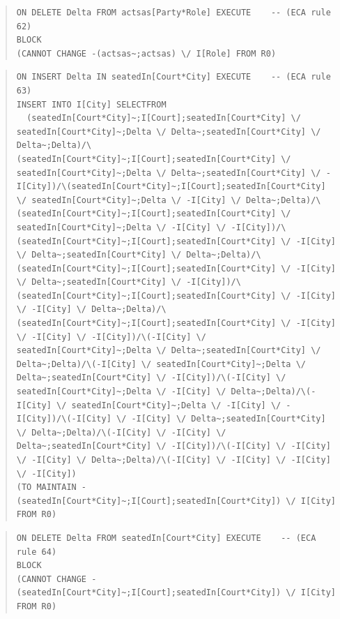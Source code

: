 \documentclass[10pt,a4paper]{report}              %
\theoremstyle{plain}\theorembodyfont{\rmfamily}\newtheorem{definition}{Definition}[section]
\theoremstyle{plain}\theorembodyfont{\rmfamily}\newtheorem{designrule}[definition]{Requirement}
\begin{document}
\begin{quote}
\begin{verbatim}
ON DELETE Delta FROM actsas[Party*Role] EXECUTE    -- (ECA rule 62)
BLOCK
(CANNOT CHANGE -(actsas~;actsas) \/ I[Role] FROM R0)
\end{verbatim}
\end{quote}
\begin{quote}
\begin{verbatim}
ON INSERT Delta IN seatedIn[Court*City] EXECUTE    -- (ECA rule 63)
INSERT INTO I[City] SELECTFROM
  (seatedIn[Court*City]~;I[Court];seatedIn[Court*City] \/ seatedIn[Court*City]~;Delta \/ Delta~;seatedIn[Court*City] \/ Delta~;Delta)/\(seatedIn[Court*City]~;I[Court];seatedIn[Court*City] \/ seatedIn[Court*City]~;Delta \/ Delta~;seatedIn[Court*City] \/ -I[City])/\(seatedIn[Court*City]~;I[Court];seatedIn[Court*City] \/ seatedIn[Court*City]~;Delta \/ -I[City] \/ Delta~;Delta)/\(seatedIn[Court*City]~;I[Court];seatedIn[Court*City] \/ seatedIn[Court*City]~;Delta \/ -I[City] \/ -I[City])/\(seatedIn[Court*City]~;I[Court];seatedIn[Court*City] \/ -I[City] \/ Delta~;seatedIn[Court*City] \/ Delta~;Delta)/\(seatedIn[Court*City]~;I[Court];seatedIn[Court*City] \/ -I[City] \/ Delta~;seatedIn[Court*City] \/ -I[City])/\(seatedIn[Court*City]~;I[Court];seatedIn[Court*City] \/ -I[City] \/ -I[City] \/ Delta~;Delta)/\(seatedIn[Court*City]~;I[Court];seatedIn[Court*City] \/ -I[City] \/ -I[City] \/ -I[City])/\(-I[City] \/ seatedIn[Court*City]~;Delta \/ Delta~;seatedIn[Court*City] \/ Delta~;Delta)/\(-I[City] \/ seatedIn[Court*City]~;Delta \/ Delta~;seatedIn[Court*City] \/ -I[City])/\(-I[City] \/ seatedIn[Court*City]~;Delta \/ -I[City] \/ Delta~;Delta)/\(-I[City] \/ seatedIn[Court*City]~;Delta \/ -I[City] \/ -I[City])/\(-I[City] \/ -I[City] \/ Delta~;seatedIn[Court*City] \/ Delta~;Delta)/\(-I[City] \/ -I[City] \/ Delta~;seatedIn[Court*City] \/ -I[City])/\(-I[City] \/ -I[City] \/ -I[City] \/ Delta~;Delta)/\(-I[City] \/ -I[City] \/ -I[City] \/ -I[City])
(TO MAINTAIN -(seatedIn[Court*City]~;I[Court];seatedIn[Court*City]) \/ I[City] FROM R0)
\end{verbatim}
\end{quote}
\begin{quote}
\begin{verbatim}
ON DELETE Delta FROM seatedIn[Court*City] EXECUTE    -- (ECA rule 64)
BLOCK
(CANNOT CHANGE -(seatedIn[Court*City]~;I[Court];seatedIn[Court*City]) \/ I[City] FROM R0)
\end{verbatim}
\end{quote}
\end{document}
